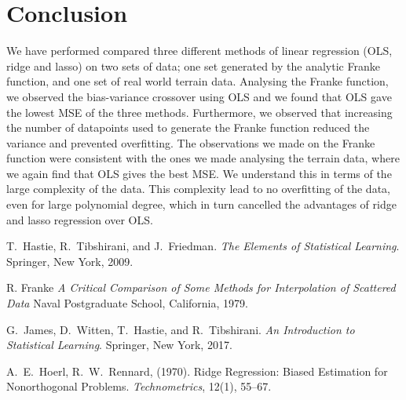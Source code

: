 \documentclass[a4paper, 
amsfonts, 
amssymb, 
amsmath, 
reprint, 
showkeys, 
nofootinbib, 
twoside]{revtex4-2}
\begin{document}
\section{Conclusion}

We have performed compared three different methods of linear regression (OLS, ridge and lasso) on two sets of data; one set generated by the analytic Franke function, and one set of real world terrain data. Analysing the Franke function, we observed the bias-variance crossover using OLS and we found that OLS gave the lowest MSE of the three methods. Furthermore, we observed that increasing the number of datapoints used to generate the Franke function reduced the variance and prevented overfitting. The observations we made on the Franke function were consistent with the ones we made analysing the terrain data, where we again find that OLS gives the best MSE. We understand this in terms of the large complexity of the data. This complexity lead to no overfitting of the data, even for large polynomial degree, which in turn cancelled the advantages of ridge and lasso regression over OLS. 

\begin{thebibliography}{4}


T.~Hastie, R.~Tibshirani, and J.~Friedman.
\textit{The Elements of Statistical Learning}.
Springer, New York, 2009.

R. Franke
\textit{A Critical Comparison of Some Methods for Interpolation of Scattered Data}
Naval Postgraduate School, California, 1979.

G.~James, D.~Witten, T.~Hastie, and R.~Tibshirani.
\textit{An Introduction to Statistical Learning}.
Springer, New York, 2017.

A.~E.~Hoerl, R.~W.~Rennard, (1970). Ridge Regression: Biased Estimation for Nonorthogonal Problems. \textit{Technometrics}, 12(1), 55–67. 

\end{thebibliography}
\end{document}
